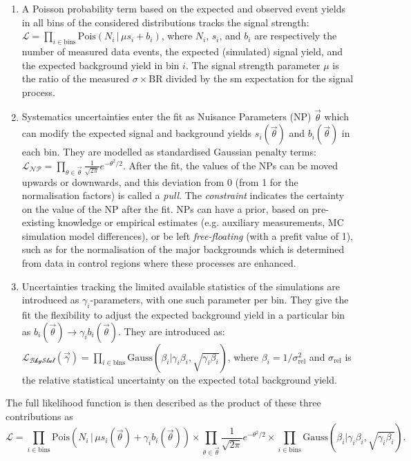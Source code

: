 \begin{enumerate}
\item A Poisson probability term based on the expected and observed event yields in all bins of the considered distributions tracks the signal strength: $\mathcal{L} = \prod_{i\in \textrm{bins}} \textrm{Pois}(N_i \,|\, \mu s_i + b_i)$, where $N_i$, $s_i$, and $b_i$ are respectively the number of measured data events, the expected (simulated) signal yield, and the expected background yield in bin $i$. The signal strength parameter $\mu$ is the ratio of the measured $\sigma \times \textrm{BR}$ divided by the \gls{sm} expectation for the signal process.  
\item Systematics uncertainties enter the fit as Nuisance Parameters (NP) $\overrightarrow{\theta}$ which can modify the expected signal and background yields $s_i(\overrightarrow{\theta})$ and $b_i(\overrightarrow{\theta})$ in each bin. They are modelled as standardised Gaussian penalty terms: $\mathcal{L_{\textrm{NP}}} = \prod_{\theta \in \overrightarrow{\theta}} \frac{1}{\sqrt{2\pi}} e^{- \theta^2/2}$. After the fit, the values of the NPs can be moved upwards or downwards, and this deviation from 0 (from 1 for the normalisation factors) is called a \textit{pull}. The \textit{constraint} indicates the certainty on the value of the NP after the fit. NPs can have a prior, based on pre-existing knowledge or empirical estimates (e.g. auxiliary measurements, MC simulation model differences), or be left \textit{free-floating} (with a prefit value of 1), such as for the normalisation of the major backgrounds which is determined from data in control regions where these processes are enhanced. 
\item Uncertainties tracking the limited available statistics of the simulations are introduced as $\gamma_i$-parameters, with one such parameter per bin. They give the fit the flexibility to adjust the expected background yield in a particular bin as $b_i(\overrightarrow{\theta}) \rightarrow \gamma_i b_i(\overrightarrow{\theta})$. They are introduced as: $\mathcal{L_{\textrm{BkgStat}}}(\overrightarrow{\gamma}) = \prod_{i \in \textrm{bins}} \textrm{Gauss}(\beta_i | \gamma_i \beta_i, \sqrt{\gamma_i \beta_i})$, where $\beta_i = 1 / \sigma^2_\textrm{rel}$ and $\sigma_\textrm{rel}$ is the relative statistical uncertainty on the expected total background yield. 
\end{enumerate} 
The full likelihood function is then described as the product of these three contributions as 
\begin{equation}
\mathcal{L} = \prod_{i\in \textrm{bins}} \textrm{Pois}(N_i \,|\, \mu s_i(\overrightarrow{\theta}) + \gamma_i b_i(\overrightarrow{\theta})) \times  \prod_{\theta \in \overrightarrow{\theta}} \frac{1}{\sqrt{2\pi}} e^{- \theta^2/2} \times \prod_{i \in \textrm{bins}} \textrm{Gauss}(\beta_i | \gamma_i \beta_i, \sqrt{\gamma_i \beta_i}).
\end{equation}
